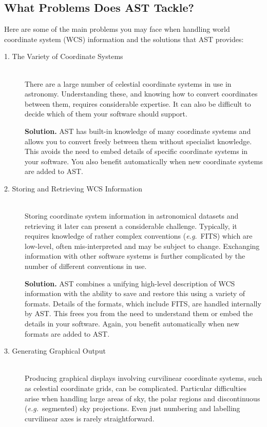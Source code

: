 \documentclass[twoside,11pt]{article}
\begin{document}

\subsection{What Problems Does AST Tackle?}

Here are some of the main problems you may face when handling world
coordinate system (WCS) information and the solutions that AST
provides:

\begin{description}
\item[1. The Variety of Coordinate Systems]\mbox{}\\
There are a large number of celestial coordinate systems in use in
astronomy. Understanding these, and knowing how to convert coordinates
between them, requires considerable expertise. It can also be
difficult to decide which of them your software should support.

{\bf{Solution.}} AST has built-in knowledge of many coordinate systems
and allows you to convert freely between them without specialist
knowledge. This avoids the need to embed details of specific
coordinate systems in your software. You also benefit automatically
when new coordinate systems are added to AST.

\item[2. Storing and Retrieving WCS Information]\mbox{}\\
Storing coordinate system information in astronomical datasets and
retrieving it later can present a considerable challenge. Typically,
it requires knowledge of rather complex conventions
({\em{e.g.}}\ FITS) which are low-level, often mis-interpreted and may
be subject to change. Exchanging information with other software
systems is further complicated by the number of different conventions
in use.

{\bf{Solution.}} AST combines a unifying high-level description of WCS
information with the ability to save and restore this using a variety
of formats. Details of the formats, which include FITS, are handled
internally by AST. This frees you from the need to understand them or
embed the details in your software. Again, you benefit automatically
when new formats are added to AST.

\item[3. Generating Graphical Output]\mbox{}\\
Producing graphical displays involving curvilinear coordinate systems,
such as celestial coordinate grids, can be complicated. Particular
difficulties arise when handling large areas of sky, the polar regions
and discontinuous ({\em{e.g.}}\ segmented) sky projections.  Even just
numbering and labelling curvilinear axes is rarely straightforward.


\end{description}
\end{document}
